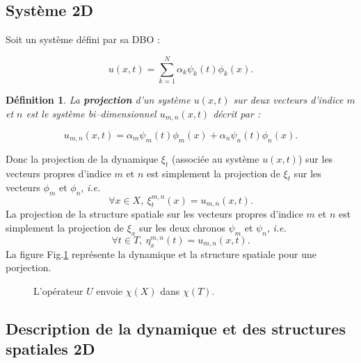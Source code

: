 \documentclass{book}
\newtheorem{defn}{D\'efinition}[chapter]
\begin{document}
\subsection{Syst\`eme 2D}
Soit un syst\`eme d\'efini par sa DBO :

\begin{equation}
u(x,t)=\sum_{k=1}^N \alpha_k \psi_k(t)\phi_k(x).
\end{equation}



\begin{defn}
La {\bf projection} d'un syst\`eme $u(x,t)$ sur deux vecteurs d'indice
$m$ et $n$ est le syst\`eme bi--dimensionnel $u_{m,n}(x,t)$ d\'ecrit par :

\begin{equation}
u_{m,n}(x,t)=\alpha_m \psi_m(t)\phi_m(x)+\alpha_n \psi_n(t)\phi_n(x).
\end{equation}

\end{defn}
Donc la projection de la dynamique $\xi_t$
 (associ\'ee au syst\`eme $u(x,t)$)
sur les vecteurs propres d'indice $m$ et $n$ est simplement 
la projection de $\xi_t$ sur les vecteurs $\phi_m$ et $\phi_n$, {\it
i.e.} 
\begin{equation}
\forall x \in X,\  \xi_t^{m,n}(x)=u_{m,n}(x,t).
\end{equation}
La projection de la structure spatiale sur les vecteurs propres 
d'indice  $m$ et $n$ est simplement la projection de $\xi_x$ 
sur les deux chronos $\psi_m$ et $\psi_n$, {\it i.e.}
\begin{equation}
\forall t \in T,\   \eta_x^{m,n}(t)=u_{m,n}(x,t).
\end{equation}
La figure Fig.\ref{bodsk} repr\'esente la dynamique et la structure
spatiale pour une porjection.
\begin{figure}
\centerline{}
\caption{L'op\'erateur $U$ envoie $\chi(X)$ dans $\chi(T)$.}
\label{bodsk}
\end{figure}

\subsection{Description de la dynamique et des structures spatiales
2D}\label{secdescriptdyn2D} 
\end{document}
